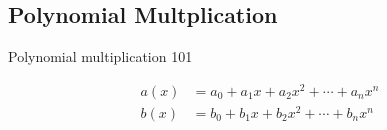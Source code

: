 \subsection{Polynomial Multplication}

\begin{frame}{Polynomial multiplication 101}
    \begin{block}{}
        \begin{equation*}
            \begin{aligned}
                a(x) &= a_0 + a_1x + a_2x^2 + \cdots + a_nx^n \\
                b(x) &= b_0 + b_1x + b_2x^2 + \cdots + b_nx^n
            \end{aligned}
        \end{equation*}
    \end{block}
\end{frame}

